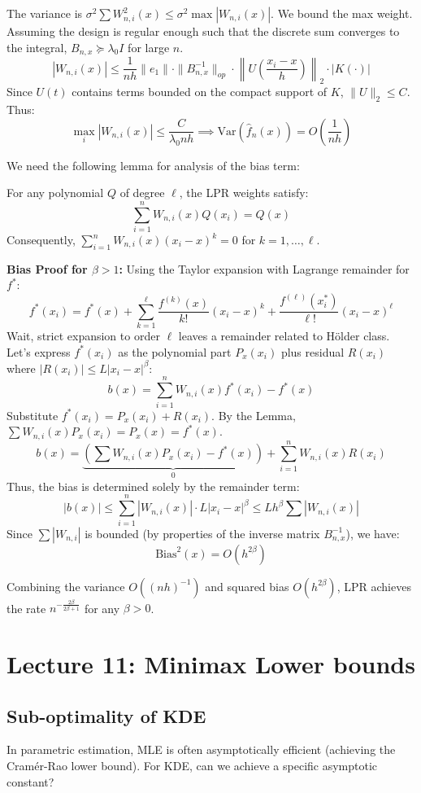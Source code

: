 The variance is $\sigma^2 \sum W_{n,i}^2(x) \le \sigma^2 \max |W_{n,i}(x)|$. We bound the max weight.
Assuming the design is regular enough such that the discrete sum converges to the integral, $B_{n,x} \succeq \lambda_0 I$ for large $n$.
$$ |W_{n,i}(x)| \le \frac{1}{nh} \|e_1\| \cdot \|B_{n,x}^{-1}\|_{op} \cdot \left\| U\left(\frac{x_i - x}{h}\right) \right\|_2 \cdot |K(\cdot)| $$
Since $U(t)$ contains terms bounded on the compact support of $K$, $\|U\|_2 \le C$. Thus:
$$ \max_i |W_{n,i}(x)| \le \frac{C}{\lambda_0 nh} \implies \text{Var}(\hat{f}_n(x)) = O\left(\frac{1}{nh}\right) $$

We need the following lemma for analysis of the bias term:
\begin{lem}
For any polynomial $Q$ of degree $\ell$, the LPR weights satisfy:
$$ \sum_{i=1}^n W_{n,i}(x) Q(x_i) = Q(x) $$
Consequently, $\sum_{i=1}^n W_{n,i}(x) (x_i - x)^k = 0$ for $k=1, \dots, \ell$.
\end{lem}

\textbf{Bias Proof for $\beta > 1$:}
Using the Taylor expansion with Lagrange remainder for $f^*$:
$$ f^*(x_i) = f^*(x) + \sum_{k=1}^\ell \frac{f^{(k)}(x)}{k!} (x_i - x)^k + \frac{f^{(\ell)}(x_i^*)}{\ell!} (x_i - x)^\ell $$
Wait, strict expansion to order $\ell$ leaves a remainder related to Hölder class. Let's express $f^*(x_i)$ as the polynomial part $P_{x}(x_i)$ plus residual $R(x_i)$ where $|R(x_i)| \le L |x_i - x|^\beta$:
$$ b(x) = \sum_{i=1}^n W_{n,i}(x) f^*(x_i) - f^*(x) $$
Substitute $f^*(x_i) = P_x(x_i) + R(x_i)$. By the Lemma, $\sum W_{n,i}(x) P_x(x_i) = P_x(x) = f^*(x)$.
$$ b(x) = \underbrace{\left( \sum W_{n,i}(x) P_x(x_i) - f^*(x) \right)}_{0} + \sum_{i=1}^n W_{n,i}(x) R(x_i) $$
Thus, the bias is determined solely by the remainder term:
$$ |b(x)| \le \sum_{i=1}^n |W_{n,i}(x)| \cdot L |x_i - x|^\beta \le L h^\beta \sum |W_{n,i}(x)| $$
Since $\sum |W_{n,i}|$ is bounded (by properties of the inverse matrix $B_{n,x}^{-1}$), we have:
$$ \text{Bias}^2(x) = O(h^{2\beta}) $$

Combining the variance $O((nh)^{-1})$ and squared bias $O(h^{2\beta})$, LPR achieves the rate $n^{-\frac{2\beta}{2\beta+1}}$ for any $\beta > 0$.


\section{Lecture 11: Minimax Lower bounds}
\subsection{Sub-optimality of KDE}
In parametric estimation, MLE is often asymptotically efficient (achieving the Cramér-Rao lower bound). For KDE, can we achieve a specific asymptotic constant?

